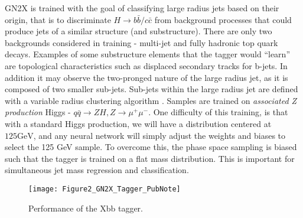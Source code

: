 \documentclass[12pt]{article}
\begin{document}
GN2X is trained with the goal of classifying large radius jets based on their
origin, that is to discriminate $H\rightarrow b\bar{b}/c\bar{c}$ from background
processes that could produce jets of a similar structure (and substructure).
There are only two backgrounds considered in training - multi-jet and fully
hadronic top quark decays. Examples of some substructure elements that the
tagger would ``learn'' are topological characteristics such as displaced
secondary tracks for b-jets. In addition it may observe the two-pronged nature
of the large radius jet, as it is composed of two smaller sub-jets. Sub-jets
within the large radius jet are defined with a variable radius clustering
algorithm \cite{jet_substructure}. Samples are trained on \textit{associated Z
production} Higgs - $q\bar{q}\rightarrow ZH, Z\rightarrow \mu^+\mu^-$. One
difficulty of this training, is that with a standard Higgs production, we will
have a distribution centered at $125 \text{GeV}$, and any neural network will
simply adjust the weights and biases to select the 125 GeV sample. To overcome
this, the phase space sampling is biased such that the tagger is trained on a
flat mass distribution. This is important for simultaneous jet mass regression
and classification.


\begin{figure}[t!]
    \centering
    \texttt{[image: Figure2\_GN2X\_Tagger\_PubNote]}
    \caption{Performance of the Xbb tagger.}
    \label{fig:Xbb_tagger}
\end{figure}
\end{document}

